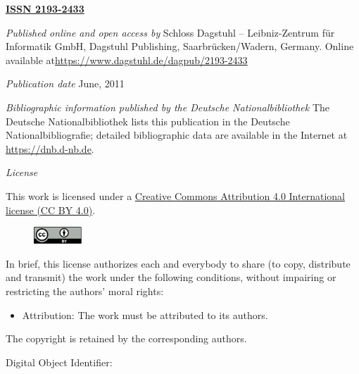 \documentclass[a4paper,USenglish]{dagman-master-v2021}
\begin{document}
\begin{publicationinfo}%
\sffamily
\twocolumn


{\Large\bf\sffamily \textbf{\href{https://www.dagstuhl.de/dagman}{ISSN 2193-2433}}}

\bigskip
\bigskip

\emph{Published online and open access by}\newline 
Schloss Dagstuhl -- Leibniz-Zentrum f\"ur Informatik GmbH, Dagstuhl
Publishing, Saarbr\"ucken/Wadern, Germany.  Online available at\newline \href{https://www.dagstuhl.de/dagpub/2193-2433}{https://www.dagstuhl.de/dagpub/2193-2433}

\bigskip
\emph{Publication date}\newline
June, 2011

\bigskip
\emph{Bibliographic information published by the Deutsche
  Nationalbibliothek}\newline 
The Deutsche Nationalbibliothek lists this publication in the Deutsche
Nationalbibliografie; detailed bibliographic data are available in the
Internet at \url{https://dnb.d-nb.de}.

\bigskip
\emph{License}

This work is licensed under a \href{https://creativecommons.org/licenses/by/4.0/de/legalcode}{Creative Commons
Attribution 4.0 International license (CC BY 4.0)}.

\begin{figure}
\vspace*{-1\baselineskip}
\includegraphics[width=1.8cm]{cc-by}
\end{figure} 
In brief, this license authorizes each and everybody to share (to
copy, distribute and transmit) the work under the following
conditions, without impairing or restricting the authors'
moral rights:
\begin{itemize}
\item Attribution: The work must be attributed to its authors.
\end{itemize}

\smallskip

The copyright is retained by the corresponding authors.

\vfill

Digital Object Identifier: \printDOI


\end{publicationinfo}
\end{document}
